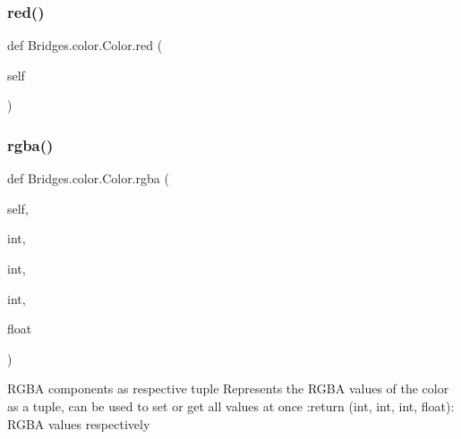 \mbox{\label{class_bridges_1_1color_1_1_color_ae89e14c5811e5bfd8812ea5aae98c60c}} 
\subsubsection{\texorpdfstring{red()}{red()}\hspace{0.1cm}{\footnotesize\ttfamily [3/3]}}
{\footnotesize\ttfamily def Bridges.\+color.\+Color.\+red (\begin{DoxyParamCaption}\item[{}]{self }\end{DoxyParamCaption})}

\mbox{\label{class_bridges_1_1color_1_1_color_a31b443f464eb5e7218ff5bd001161d2b}} 
\subsubsection{\texorpdfstring{rgba()}{rgba()}\hspace{0.1cm}{\footnotesize\ttfamily [1/3]}}
{\footnotesize\ttfamily def Bridges.\+color.\+Color.\+rgba (\begin{DoxyParamCaption}\item[{}]{self,  }\item[{}]{int,  }\item[{}]{int,  }\item[{}]{int,  }\item[{}]{float }\end{DoxyParamCaption})}

\begin{DoxyVerb}RGBA components as respective tuple
Represents the RGBA values of the color as a tuple, can be used to set or get all values at once
:return (int, int, int, float): RGBA values respectively
\end{DoxyVerb}
 \mbox{\label{class_bridges_1_1color_1_1_color_adfbba0839dbf564ef5befb8f19b26fdf}} 
